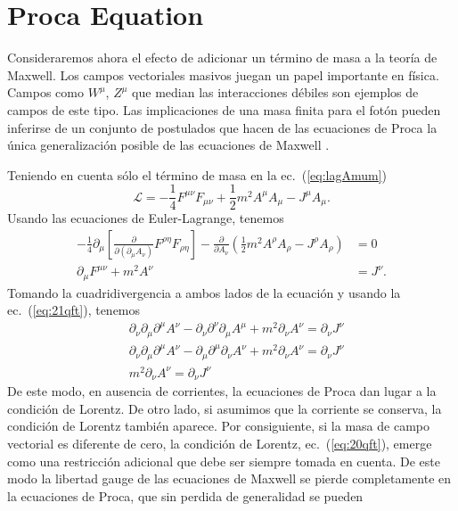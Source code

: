 \section{Proca Equation}
\label{sec:proca-equation}
Consideraremos ahora el efecto de adicionar un término de masa a la teoría de
Maxwell. Los campos vectoriales masivos juegan un papel importante en
física. Campos como $W^\mu$, $Z^\mu$ que median las interacciones débiles
son ejemplos de campos de este tipo. Las implicaciones de una masa
finita para el fotón pueden inferirse de un conjunto de postulados que
hacen de las ecuaciones de Proca la única generalización posible de
las ecuaciones de Maxwell \cite{Goldhaber:1971mr}. 

Teniendo en cuenta sólo el término de masa en la ec.~(\ref{eq:lagAmum})
\begin{equation}
  \label{eq:23qft}
  \mathcal{L}=-\frac{1}{4}F^{\mu\nu}F_{\mu\nu}+\frac{1}{2}m^2A^\mu A_\mu-J^\mu A_\mu.
\end{equation}
Usando las ecuaciones de Euler-Lagrange, tenemos
\begin{align}
-\frac{1}{4}\partial_\mu
  \left[
\frac{\partial}{\partial(\partial_\mu A_\nu)}F^{\rho\eta}F_{\rho\eta}
  \right]-
\frac{\partial}{\partial A_\nu}
\left(
\frac{1}{2}m^2A^\rho A_\rho-J^\rho A_\rho
\right)&=0\nonumber\\
\label{eq:24qft}
\partial_\mu F^{\mu\nu}+m^2A^\nu&=J^\nu.
\end{align}
Tomando la cuadridivergencia a ambos lados de la ecuación y usando la
ec.~(\ref{eq:21qft}), tenemos
\begin{align}
 &\partial_\nu\partial_\mu\partial^\mu A^\nu-\partial_\nu\partial^\nu\partial_\mu A^\mu+m^2\partial_\nu A^\nu=\partial_\nu J^\nu\nonumber\\
 &\partial_\nu\partial_\mu\partial^\mu A^\nu-\partial_\mu\partial^\mu\partial_\nu A^\nu+m^2\partial_\nu A^\nu=\partial_\nu J^\nu\nonumber\\
\label{eq:25qft}
 &m^2\partial_\nu A^\nu=\partial_\nu J^\nu
\end{align}
De este modo, en ausencia de corrientes, la ecuaciones de Proca dan
lugar a la condición de Lorentz. De otro lado, si asumimos que la
corriente se conserva, la condición de Lorentz también aparece. Por
consiguiente, si la masa de campo vectorial es diferente de cero, la
condición de Lorentz, ec.~(\ref{eq:20qft}), emerge como una restricción
adicional que debe ser siempre tomada en cuenta. De este modo la
libertad gauge de las ecuaciones de Maxwell se pierde completamente en
la ecuaciones de Proca, que sin perdida de generalidad se pueden
